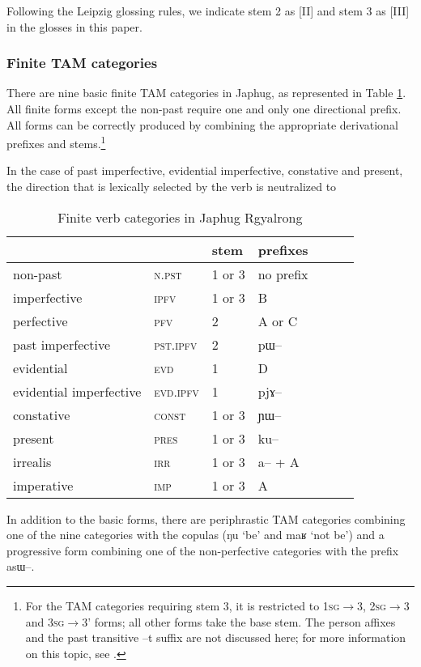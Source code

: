 \documentclass[oldfontcommands,oneside,a4paper,11pt]{article}
\newcommand{\ipa}[1]{{\phon \mbox{#1}}} %
\begin{document}
Following the Leipzig glossing rules, we indicate stem 2 as [II] and stem 3 as [III] in the glosses in this paper.
\subsubsection{Finite TAM categories} \label{sec:finite.TAM}
There are nine basic finite TAM categories in Japhug, as represented in Table \ref{tab:finite.forms}. All finite forms except the non-past require one and only one directional prefix. All forms can be correctly produced by combining the appropriate derivational prefixes and stems.\footnote{For the TAM categories requiring stem 3, it is restricted to  \textsc{1sg}$\rightarrow$3, \textsc{2sg}$\rightarrow$3 and \textsc{3sg}$\rightarrow$3' forms; all other forms take the base stem.  The person affixes and the past transitive \ipa{--t} suffix are not discussed here; for  more information on this topic, see \citet{jacques10inverse}.}


In the case of past imperfective, evidential imperfective, constative and present, the direction that is lexically selected by the verb is neutralized to 

\begin{table}
\caption{Finite verb categories in Japhug Rgyalrong} \label{tab:finite.forms} \centering
\begin{tabular}{lllllll}
\toprule
&	&	stem&	prefixes\\
\midrule
non-past&	\textsc{n.pst} &	1 or 3&	no prefix\\
imperfective&	\textsc{ipfv} &	1 or 3&	B\\
perfective&	\textsc{pfv} &	2&	A or C\\
past imperfective&	\textsc{pst.ipfv} &	2&	\ipa{pɯ--}\\
evidential&	\textsc{evd} &	1&	D\\
evidential imperfective&	\textsc{evd.ipfv} &	1&	\ipa{pjɤ--}\\
constative&	\textsc{const} &	1 or 3&	\ipa{ɲɯ--}\\
present&	\textsc{pres} &	1 or 3&	\ipa{ku--}\\
irrealis&	\textsc{irr} &	1 or 3&	\ipa{a--} + A\\
imperative&	\textsc{imp} &	1 or 3&	A\\
\bottomrule
\end{tabular}
\end{table}

In addition to the basic forms, there are periphrastic TAM categories combining one of the nine categories with the copulas (\ipa{ŋu} `be' and \ipa{maʁ} `not be') and a progressive form combining one of the non-perfective categories with the prefix \ipa{asɯ}--.
\end{document}
